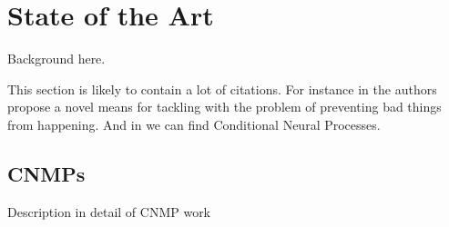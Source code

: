 \chapter{State of the Art} %
\label{chap:background}

Background here.

This section is likely to contain a lot of citations.
%
For instance in \cite{Ugur-RSS-19} the authors propose a novel means for tackling with the problem of preventing bad things from happening. And in \cite{DBLP:journals/corr/abs-1807-01613} we can find Conditional Neural Processes.

\section{CNMPs}
Description in detail of CNMP work